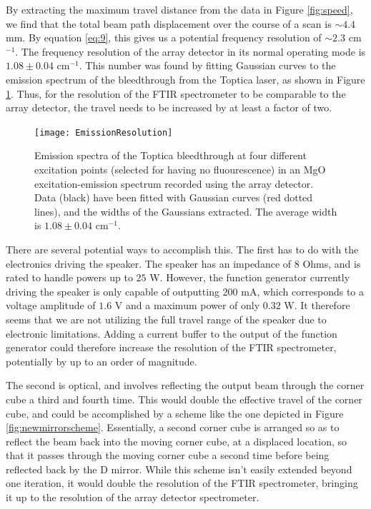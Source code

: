 \documentclass[12pt]{puthesis}
\newcommand{\wn}[1][ ]{cm$^{-1}$#1}
\begin{document}
By extracting the maximum travel distance from the data in Figure \ref{fig:speed}, we find that the total beam path displacement over the course of a scan is $\sim 4.4$ mm. By equation \eqref{eq:9}, this gives us a potential frequency resolution of $\sim 2.3$ \wn[]. The frequency resolution of the array detector in its normal operating mode is $1.08 \pm 0.04$ \wn[]. This number was found by fitting Gaussian curves to the emission spectrum of the bleedthrough from the Toptica laser, as shown in Figure \ref{fig:emresolution}. Thus, for the resolution of the FTIR spectrometer to be comparable to the array detector, the travel needs to be increased by at least a factor of two.

\begin{figure}[t]
  \centering
  \texttt{[image: EmissionResolution]}
  \caption{Emission spectra of the Toptica bleedthrough at four different excitation points (selected for having no fluourescence) in an MgO excitation-emission spectrum recorded using the array detector. Data (black) have been fitted with Gaussian curves (red dotted lines), and the widths of the Gaussians extracted. The average width is $1.08\pm 0.04$ \wn[.]}
  \label{fig:emresolution}
\end{figure}

There are several potential ways to accomplish this. The first has to do with the electronics driving the speaker. The speaker has an impedance of 8 Ohms, and is rated to handle powers up to $25$ W. However, the function generator currently driving the speaker is only capable of outputting 200 mA, which corresponds to a voltage amplitude of $1.6$ V and a maximum power of only $0.32$ W. It therefore seems that we are not utilizing the full travel range of the speaker due to electronic limitations. Adding a current buffer to the output of the function generator could therefore increase the resolution of the FTIR spectrometer, potentially by up to an order of magnitude.

The second is optical, and involves reflecting the output beam through the corner cube a third and fourth time. This would double the effective travel of the corner cube, and could be accomplished by a scheme like the one depicted in Figure \ref{fig:newmirrorscheme}. Essentially, a second corner cube is arranged so as to reflect the beam back into the moving corner cube, at a displaced location, so that it passes through the moving corner cube a second time before being reflected back by the D mirror. While this scheme isn't easily extended beyond one iteration, it would double the resolution of the FTIR spectrometer, bringing it up to the resolution of the array detector spectrometer. 
\end{document}
